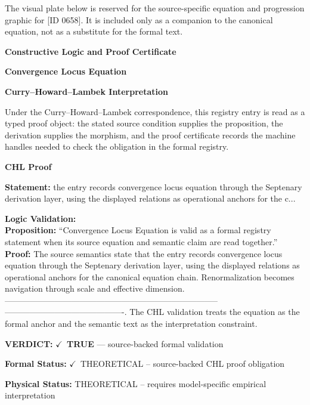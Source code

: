 \begingroup\footnotesize\sloppy
The visual plate below is reserved for the source-specific equation and progression graphic for [ID 0658]. It is included only as a companion to the canonical equation, not as a substitute for the formal text.
\par\endgroup
\ifTZPDarkEdition
{}
\fi

\clearpage
\begingroup\tzpsupportsetup
\noindent\textbf{\fontsize{10.8pt}{12.8pt}\selectfont [ID 0658] Constructive Logic and Proof Certificate}\par
\noindent\textbf{\fontsize{10pt}{12pt}\selectfont Convergence Locus Equation}\par
\vspace{0.45em}
\begingroup
\footnotesize
\setlength{\parskip}{0.22em}
\setlength{\parindent}{0pt}
\noindent\textbf{Curry--Howard--Lambek Interpretation}\par
Under the Curry--Howard--Lambek correspondence, this registry entry is read as a typed proof
object: the stated source condition supplies the proposition, the derivation supplies the
morphism, and the proof certificate records the machine handles needed to check the obligation
in the formal registry.

\vspace{0.45em}
\noindent\textbf{CHL Proof}\par
\textbf{Statement:} the entry records convergence locus equation through the Septenary derivation layer,
using the displayed relations as operational anchors for the c...

\textbf{Logic Validation:}\\
\textbf{Proposition:} ``Convergence Locus Equation is valid as a formal registry statement when its source
equation and semantic claim are read together.''\\
\textbf{Proof:} The source semantics state that the entry records convergence locus equation through the
Septenary derivation layer, using the displayed relations as operational anchors for the
canonical equation chain. Renormalization becomes navigation through scale and effective
dimension. -----------------------------------------------------------------------------
-------------------------------------------. The CHL validation treats the equation as
the formal anchor and the semantic text as the interpretation constraint.

\textbf{VERDICT:} \ensuremath{\checkmark}\ \textbf{TRUE} --- source-backed formal validation

\textbf{Formal Status:} \ensuremath{\checkmark}\ THEORETICAL -- source-backed CHL proof obligation

\textbf{Physical Status:} THEORETICAL -- requires model-specific empirical interpretation
\par\vspace{0.45em}
\par
\ifTZPDarkEdition
{}
\fi
\endgroup
\endgroup
